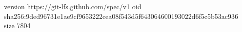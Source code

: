 version https://git-lfs.github.com/spec/v1
oid sha256:9ded96731e1ae9cf9653222cea08f543d5f643064600193022d6f5c5b53ac936
size 7804
